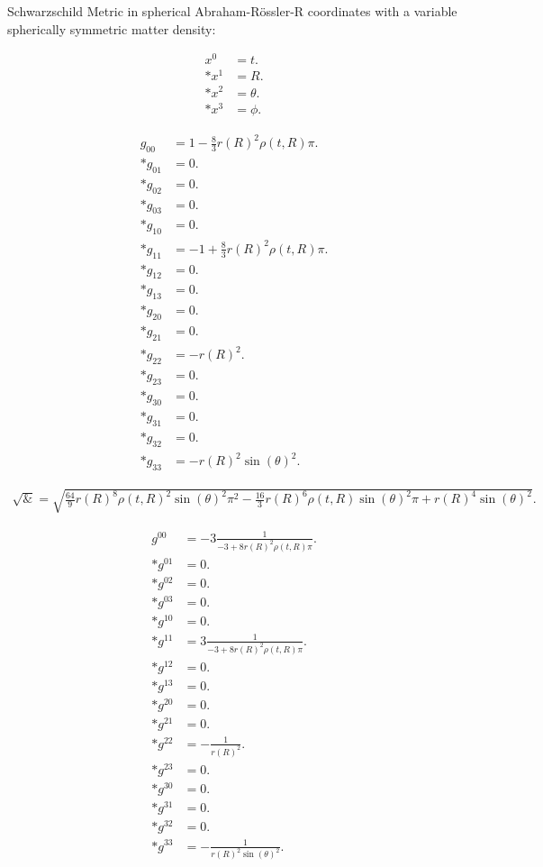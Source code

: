 \documentclass[fleqn,portrait]{article}
\begin{document}
{ \Large
Schwarzschild Metric in spherical Abraham-Rössler-R coordinates with a variable spherically symmetric matter density:
}
\bigskip
\bigskip

\begin{align*}
x^{0} & = t. \\*
x^{1} & = R. \\*
x^{2} & = \theta. \\*
x^{3} & = \phi.
\end{align*}


\begin{align*}
g_{00} & = 1-\frac{8}{3}  r(R)^{2} \rho(t,R) \pi. \\*
g_{01} & = 0. \\*
g_{02} & = 0. \\*
g_{03} & = 0. \\*
g_{10} & = 0. \\*
g_{11} & = -1+\frac{8}{3}  r(R)^{2} \rho(t,R) \pi. \\*
g_{12} & = 0. \\*
g_{13} & = 0. \\*
g_{20} & = 0. \\*
g_{21} & = 0. \\*
g_{22} & = - r(R)^{2}. \\*
g_{23} & = 0. \\*
g_{30} & = 0. \\*
g_{31} & = 0. \\*
g_{32} & = 0. \\*
g_{33} & = - r(R)^{2} \sin(\theta)^{2}.
\end{align*}

\begin{align*}
\surd & = \sqrt{\frac{64}{9}  r(R)^{8} \rho(t,R)^{2} \sin(\theta)^{2} \pi^{2}-\frac{16}{3}  r(R)^{6} \rho(t,R) \sin(\theta)^{2} \pi+ r(R)^{4} \sin(\theta)^{2}}.\end{align*}

\begin{align*}
g^{00} & = -3 \frac{1}{-3+8  r(R)^{2} \rho(t,R) \pi}. \\*
g^{01} & = 0. \\*
g^{02} & = 0. \\*
g^{03} & = 0. \\*
g^{10} & = 0. \\*
g^{11} & = 3 \frac{1}{-3+8  r(R)^{2} \rho(t,R) \pi}. \\*
g^{12} & = 0. \\*
g^{13} & = 0. \\*
g^{20} & = 0. \\*
g^{21} & = 0. \\*
g^{22} & = -\frac{1}{r(R)^{2}}. \\*
g^{23} & = 0. \\*
g^{30} & = 0. \\*
g^{31} & = 0. \\*
g^{32} & = 0. \\*
g^{33} & = -\frac{1}{ r(R)^{2} \sin(\theta)^{2}}.
\end{align*}
\end{document}
